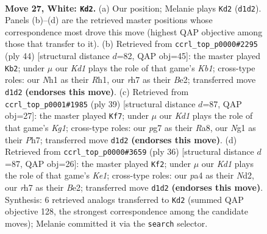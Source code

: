 \documentclass[11pt]{article}
\begin{document}
\clearpage

\begin{figure}[p]\centering
\begin{subfigure}{0.46\textwidth}\centering
\resizebox{\linewidth}{!}{%
\newchessgame
\chessboard[
  setfen={3r1b2/2nkn1pr/6b1/7p/p1B1pP1P/P3R3/1P4P1/R2K2NN w - - 14 27},
  showmover=false,
  pgfstyle=straightmove, color=movearrow, markmove={d1-d2}
]}
\caption{}
\end{subfigure}\hfill
\begin{subfigure}{0.46\textwidth}\centering
\resizebox{\linewidth}{!}{%
\newchessgame
\chessboard[
  setfen={4b2r/1pr1kpR1/p3p2p/1n2P3/5P2/1N6/P1P1B1PP/1K5R w - - 1 23},
  showmover=false,
  pgfstyle=straightmove, color=movearrow, markmove={b1-b2}
]}
\caption{}
\end{subfigure}
\\[4pt]
\begin{subfigure}{0.46\textwidth}\centering
\resizebox{\linewidth}{!}{%
\newchessgame
\chessboard[
  setfen={r3r1k1/1p5p/p2b1pp1/3p3n/3N4/3PB2P/PP3PP1/R3RK2 b - - 1 20},
  showmover=false,
  pgfstyle=straightmove, color=movearrow, markmove={g8-f7}
]}
\caption{}
\end{subfigure}\hfill
\begin{subfigure}{0.46\textwidth}\centering
\resizebox{\linewidth}{!}{%
\newchessgame
\chessboard[
  setfen={2r4r/pp1bkpp1/2n1p1p1/8/1P3P2/P3P3/3NB1PP/2R1K2R w K - 1 19},
  showmover=false,
  pgfstyle=straightmove, color=movearrow, markmove={e1-f2}
]}
\caption{}
\end{subfigure}
\caption{\textbf{Move 27, White: \texttt{Kd2}.} (a) Our position; Melanie plays \texttt{Kd2} (\texttt{d1d2}). Panels (b)--(d) are the retrieved master positions whose correspondence most drove this move (highest QAP objective among those that transfer to it). (b) Retrieved from \texttt{ccrl\_top\_p0000\#2295} (ply 44) [structural distance $d$=82, QAP obj=45]: the master played \texttt{Kb2}; under $\mu$ our \emph{Kd1} plays the role of that game's \emph{Kb1}; cross-type roles: our \emph{N}h1 as their \emph{R}h1, our \emph{r}h7 as their \emph{B}e2; transferred move \texttt{d1d2} \textbf{(endorses this move)}. (c) Retrieved from \texttt{ccrl\_top\_p0001\#1985} (ply 39) [structural distance $d$=87, QAP obj=27]: the master played \texttt{Kf7}; under $\mu$ our \emph{Kd1} plays the role of that game's \emph{Kg1}; cross-type roles: our \emph{p}g7 as their \emph{R}a8, our \emph{N}g1 as their \emph{P}h7; transferred move \texttt{d1d2} \textbf{(endorses this move)}. (d) Retrieved from \texttt{ccrl\_top\_p0000\#3659} (ply 36) [structural distance $d$=87, QAP obj=26]: the master played \texttt{Kf2}; under $\mu$ our \emph{Kd1} plays the role of that game's \emph{Ke1}; cross-type roles: our \emph{p}a4 as their \emph{N}d2, our \emph{r}h7 as their \emph{B}e2; transferred move \texttt{d1d2} \textbf{(endorses this move)}. Synthesis: 6 retrieved analogs transferred to \texttt{Kd2} (summed QAP objective 128, the strongest correspondence among the candidate moves); Melanie committed it via the \texttt{search} selector.}
\label{fig:thought-m52}
\end{figure}
\end{document}
